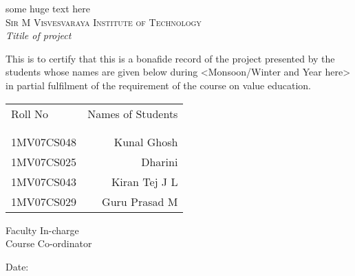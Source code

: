 \newpage
\thispagestyle{empty}

\begin{center}

\huge{ some huge text here}\\
\normalsize
\textsc{Sir M Visvesvaraya Institute of Technology}\\[2.0cm]

\emph{\LARGE Titile of project}\\[2.5cm]
\end{center}
\normalsize This is to certify that this is a bonafide record of the project presented by the students whose names are given below during <Monsoon/Winter and Year here> in partial fulfilment of the requirement of the course on value education.\\[1.0cm]

\begin{table}[h]
\centering
\begin{tabular}{lr}
Roll No & Names of Students \\ \\ \hline
\\
1MV07CS048 & Kunal Ghosh \\ 
1MV07CS025 & Dharini \\ 
1MV07CS043 & Kiran Tej J L \\ 
1MV07CS029 & Guru Prasad M \\ 
\end{tabular}
\end{table}

\vfill


\begin{flushright}
Faculty In-charge\\[1.5cm]
Course Co-ordinator\\[1.0cm]
\end{flushright}

\begin{flushleft}
Date:
\end{flushleft}

